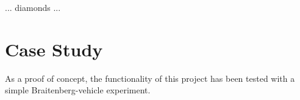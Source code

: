 ... diamonds ...



    \section{Case Study}
As a proof of concept, the functionality of this project has been tested with a simple Braitenberg-vehicle experiment.